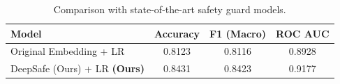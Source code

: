 \begin{table}[t]
\centering
\caption{Comparison with state-of-the-art safety guard models.}
\label{tab:sota}
\small
\begin{tabular}{@{}lccc@{}}
\toprule
\textbf{Model} & \textbf{Accuracy} & \textbf{F1 (Macro)} & \textbf{ROC AUC} \\
\midrule
Original Embedding + LR & 0.8123 & 0.8116 & 0.8928 \\
DeepSafe (Ours) + LR \textbf{(Ours)} & 0.8431 & 0.8423 & 0.9177 \\
\bottomrule
\end{tabular}
\end{table}